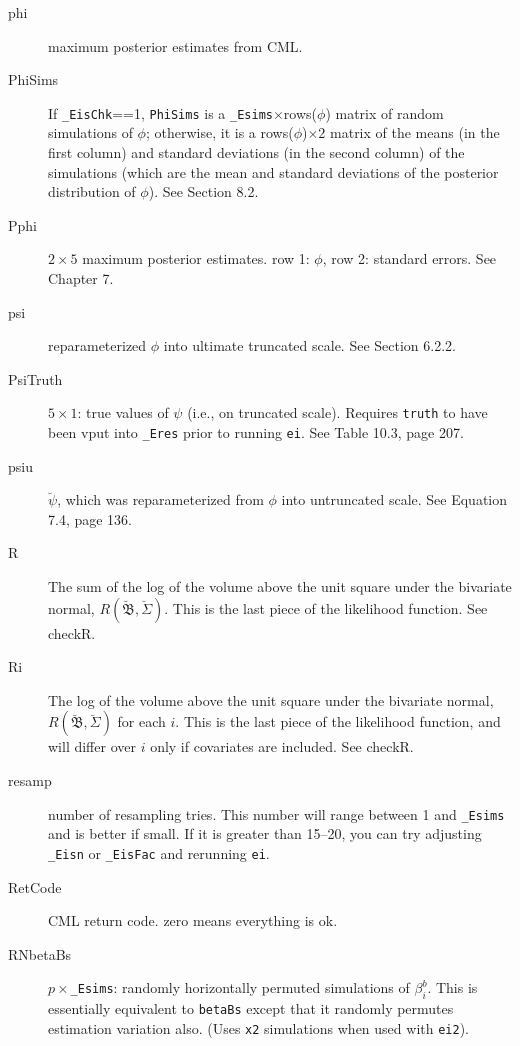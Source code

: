\documentclass[11pt,titlepage]{article}
\newcommand{\bbetau}{\breve{\mathfrak B}}
\newcommand{\Sigmau}{\breve{\Sigma}}
\newcommand{\psiu}{\breve{\psi}}
\begin{document}
\begin{description}
\item[phi] maximum posterior estimates from CML.

\item[PhiSims] If \texttt{\_EisChk}==1, \texttt{PhiSims} is a
  \texttt{\_Esims}$\times$rows($\phi$) matrix of random simulations of
  $\phi$; otherwise, it is a rows($\phi$)$\times 2$ matrix of the
  means (in the first column) and standard deviations (in the second
  column) of the simulations (which are the mean and standard
  deviations of the posterior distribution of $\phi$).  See Section
  8.2.

\item[Pphi] $2\times 5$ maximum posterior estimates.  row 1: $\phi$,
  row 2: standard errors.  See Chapter 7.

\item[psi] reparameterized $\phi$ into ultimate truncated scale.  See
  Section 6.2.2.

\item[PsiTruth] $5\times 1$: true values of $\psi$ (i.e., on truncated
  scale).  Requires \texttt{truth} to have been vput into
  \texttt{\_Eres} prior to running \texttt{ei}. See Table 10.3, page
  207.

\item[psiu] $\psiu$, which was reparameterized from $\phi$ into
  untruncated scale.  See Equation 7.4, page 136.

\item[R] The sum of the log of the volume above the unit square under
  the bivariate normal, $R(\bbetau,\Sigmau)$.  This is the last piece
  of the likelihood function.  See checkR.

\item[Ri] The log of the volume above the unit square under the
  bivariate normal, $R(\bbetau,\Sigmau)$ for each $i$.  This is the
  last piece of the likelihood function, and will differ over $i$ only
  if covariates are included.  See checkR.

\item[resamp] number of resampling tries.  This number will range
  between 1 and \texttt{\_Esims} and is better if small.  If it is
  greater than 15--20, you can try adjusting \texttt{\_Eisn} or
  \texttt{\_EisFac} and rerunning \texttt{ei}.

\item[RetCode] CML return code.  zero means everything is ok.

\item[RNbetaBs] $p\times$\texttt{\_Esims}: randomly horizontally
  permuted simulations of $\beta_i^b$.  This is essentially equivalent
  to \texttt{betaBs} except that it randomly permutes estimation
  variation also.  (Uses \texttt{x2} simulations when used with
  \texttt{ei2}).


\end{description}
\end{document}
